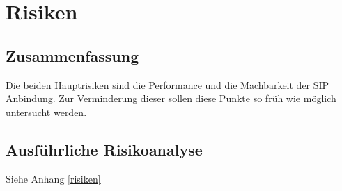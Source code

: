 \chapter{Risiken}
	\section{Zusammenfassung}
		Die beiden Hauptrisiken sind die Performance und die Machbarkeit der SIP Anbindung. Zur Verminderung dieser sollen diese Punkte so früh wie möglich untersucht werden.
	
	\section{Ausführliche Risikoanalyse}	
		Siehe Anhang \ref{risiken}
